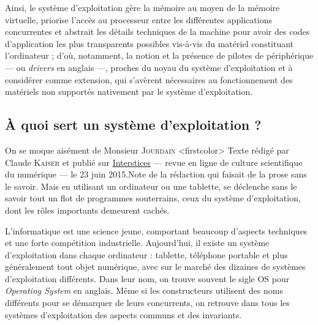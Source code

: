 
\begin{fullwidth}
\begin{tcolorbox}[
	enhanced jigsaw,
	width=\linewidth,
	breakable,
	parbox=true,
	colframe=secondcolor,
	colback=gray!20,
	arc = 0pt, outer arc = 0pt,
	leftrule = 2pt, rightrule = 2pt,
	bottomrule = 0pt, toprule=0pt,
	boxrule = 0pt,
	boxsep = 0pt,%
	left = 8pt, right = 8pt,%
	top = 6pt, bottom = 4pt,%
	title={\strut\textsc{\boxtitlefont En bref...}},
	toptitle=5pt, bottomtitle=3pt,
	before skip=10pt,
	after skip=2pt,
	]
Ainsi, le système d'exploitation gère la mémoire au moyen de la mémoire virtuelle, priorise l'accès au processeur entre les différentes applications concurrentes et abstrait les détails techniques de la machine pour avoir des codes d'application les plus transparents possibles vis-à-vis du matériel constituant l’ordinateur ; d'où, notamment, la notion et la présence de pilotes de périphérique --- ou \textit{drivers} en anglais ---, proches du noyau du système d'exploitation et à considérer comme extension, qui s'avèrent nécessaires au fonctionnement des matériels non supportés nativement par le système d'exploitation.
\end{tcolorbox}
\end{fullwidth}

\subsection[À quoi sert un OS ?]{À quoi sert un système d'exploitation ?}
\label{subsub:I.2.2}

On se moque aisément de Monsieur \textsc{Jourdain}%
\caution[t]<firstcolor>{%
Texte rédigé par Claude \textsc{Kaiser} et publié sur \href{https://interstices.info/a-quoi-sert-un-systeme-dexploitation/}{Interstices} --- revue en ligne de culture scientifique du numérique --- le 23 juin 2015.}{Note de la rédaction}
qui faisait de la prose sans le savoir. Mais en utilisant un ordinateur ou une tablette, se déclenche sans le savoir tout un flot de programmes souterrains, ceux du système d’exploitation, dont les rôles importants demeurent cachés.

L’informatique est une science jeune, comportant beaucoup d’aspects techniques et une forte compétition industrielle. Aujourd’hui, il existe un système d’exploitation dans chaque ordinateur : tablette, téléphone portable et plus généralement tout objet numérique, avec sur le marché des dizaines de systèmes d'exploitation différents. Dans leur nom, on trouve souvent le sigle OS pour \textit{Operating System} en anglais. Même si les constructeurs utilisent des noms différents pour se démarquer de leurs concurrents, on retrouve dans tous les systèmes d’exploitation des aspects communs et des invariants.

